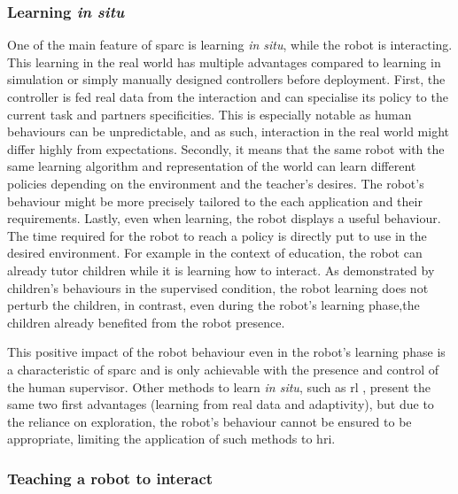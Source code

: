 \subsubsection{Learning \emph{in situ}}

One of the main feature of \gls{sparc} is learning \emph{in situ}, while the robot is interacting. This learning in the real world has multiple advantages compared to learning in simulation or simply manually designed controllers before deployment. First, the controller is fed real data from the interaction and can specialise its policy to the current task and partners specificities. This is especially notable as human behaviours can be unpredictable, and as such, interaction in the real world might differ highly from expectations. Secondly, it means that the same robot with the same learning algorithm and representation of the world can learn different policies depending on the environment and the teacher's desires. The robot's behaviour might be more precisely tailored to the each application and their requirements. Lastly, even when learning, the robot displays a useful behaviour. The time required for the robot to reach a policy is directly put to use in the desired environment. For example in the context of education, the robot can already tutor children while it is learning how to interact. As demonstrated by children's behaviours in the supervised condition, the robot learning does not perturb the children, in contrast, even during the robot's learning phase,the children already benefited from the robot presence. 

This positive impact of the robot behaviour even in the robot's learning phase is a characteristic of \gls{sparc} and is only achievable with the presence and control of the human supervisor. Other methods to learn \emph{in situ}, such as \gls{rl} \citep{sutton1998reinforcement}, present the same two first advantages (learning from real data and adaptivity), but due to the reliance on exploration, the robot's behaviour cannot be ensured to be appropriate, limiting the application of such methods to \gls{hri}.

\subsubsection{Teaching a robot to interact}

